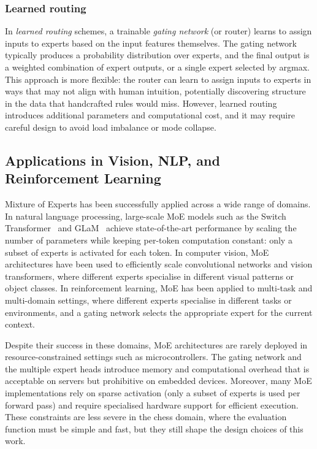 \subsubsection{Learned routing}\label{sec:learned-routing}

In \emph{learned routing} schemes, a trainable \emph{gating network} (or router) learns to assign inputs to experts based on the input features themselves. The gating network typically produces a probability distribution over experts, and the final output is a weighted combination of expert outputs, or a single expert selected by argmax. This approach is more flexible: the router can learn to assign inputs to experts in ways that may not align with human intuition, potentially discovering structure in the data that handcrafted rules would miss. However, learned routing introduces additional parameters and computational cost, and it may require careful design to avoid load imbalance or mode collapse.

\subsection{Applications in Vision, NLP, and Reinforcement Learning}\label{sec:moe-apps}

Mixture of Experts has been successfully applied across a wide range of domains. In natural language processing, large-scale MoE models such as the Switch Transformer~\cite{fedus2022switch} and GLaM~\cite{du2022glam} achieve state-of-the-art performance by scaling the number of parameters while keeping per-token computation constant: only a subset of experts is activated for each token. In computer vision, MoE architectures have been used to efficiently scale convolutional networks and vision transformers, where different experts specialise in different visual patterns or object classes. In reinforcement learning, MoE has been applied to multi-task and multi-domain settings, where different experts specialise in different tasks or environments, and a gating network selects the appropriate expert for the current context.

Despite their success in these domains, MoE architectures are rarely deployed in resource-constrained settings such as microcontrollers. The gating network and the multiple expert heads introduce memory and computational overhead that is acceptable on servers but prohibitive on embedded devices. Moreover, many MoE implementations rely on sparse activation (only a subset of experts is used per forward pass) and require specialised hardware support for efficient execution. These constraints are less severe in the chess domain, where the evaluation function must be simple and fast, but they still shape the design choices of this work.

